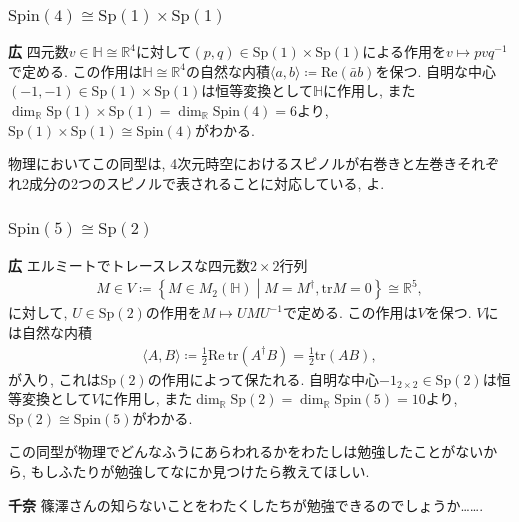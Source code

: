 \documentclass{ltjsarticle}
\theoremstyle{definition}
\newcommand{\parno}{\par\noindent}
\begin{document}
\subsubsection{$\mathrm{Spin}(4)\cong\mathrm{Sp}(1)\times\mathrm{Sp}(1)$}
\noindent
\textbf{広} 四元数$v\in\mathbb H\cong\mathbb R^4$に対して$(p,q)\in\mathrm{Sp}(1)\times\mathrm{Sp}(1)$による作用を$v\mapsto pvq^{-1}$で定める. この作用は$\mathbb H\cong\mathbb R^4$の自然な内積$\langle a,b\rangle\coloneqq\mathrm{Re}(\bar ab)$を保つ. 自明な中心$(-1,-1)\in\mathrm{Sp}(1)\times\mathrm{Sp}(1)$は恒等変換として$\mathbb H$に作用し, また$\dim_{\mathbb{R}}\mathrm{Sp}(1)\times\mathrm{Sp}(1)=\dim_{\mathbb R}\mathrm{Spin}(4)=6$より, $\mathrm{Sp}(1)\times\mathrm{Sp}(1)\cong\mathrm{Spin}(4)$がわかる.\par
物理においてこの同型は, 4次元時空におけるスピノルが右巻きと左巻きそれぞれ2成分の2つのスピノルで表されることに対応している, よ.

\subsubsection{$\mathrm{Spin}(5)\cong\mathrm{Sp}(2)$}
\noindent
\textbf{広} エルミートでトレースレスな四元数$2\times2$行列
\begin{align}
M\in V\coloneqq\left\{M\in M_2(\mathbb H)\middle|M=M^\dagger, \mathrm{tr}M=0\right\}\cong\mathbb R^5,
\end{align}
に対して, $U\in\mathrm{Sp}(2)$の作用を$M\mapsto UMU^{-1}$で定める. この作用は$V$を保つ. $V$には自然な内積
\begin{align}
\langle A,B\rangle\coloneqq\frac12\mathrm{Re}\ \mathrm{tr}\left(A^\dagger B\right)=\frac12\mathrm{tr}(AB),
\end{align}
が入り, これは$\mathrm{Sp}(2)$の作用によって保たれる. 自明な中心$-1_{2\times2}\in\mathrm{Sp}(2)$は恒等変換として$V$に作用し, また$\dim_{\mathbb{R}}\mathrm{Sp}(2)=\dim_{\mathbb R}\mathrm{Spin}(5)=10$より, $\mathrm{Sp}(2)\cong\mathrm{Spin}(5)$がわかる.\par
この同型が物理でどんなふうにあらわれるかをわたしは勉強したことがないから, もしふたりが勉強してなにか見つけたら教えてほしい.\parno
\textbf{千奈} 篠澤さんの知らないことをわたくしたちが勉強できるのでしょうか…….
\end{document}
